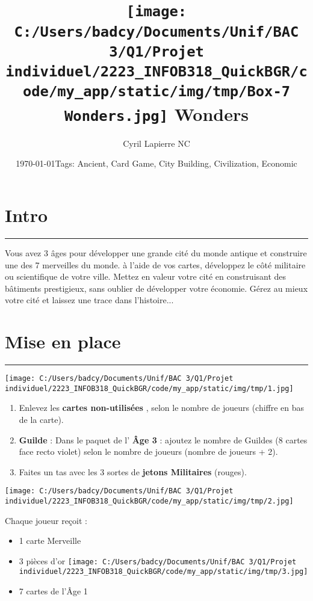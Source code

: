 \documentclass{scrartcl}%
\title{\texttt{[image: C:/Users/badcy/Documents/Unif/BAC 3/Q1/Projet individuel/2223\_INFOB318\_QuickBGR/code/my\_app/static/img/tmp/Box-7 Wonders.jpg]}\break 7 Wonders }%
\author{Cyril Lapierre NC}%
\date{\today \break Tags: Ancient, Card Game, City Building, Civilization, Economic}%
\begin{document}
%
\normalsize%
\maketitle\thispagestyle{header}%
\pagestyle{header}%
\section{ Intro
}%
\label{sec:Intro}%
\rule{18cm}{0.07cm}\break%
Vous avez 3 âges pour développer une grande cité du monde antique et construire une des 7 merveilles du
%
monde. à l’aide de vos cartes, développez le côté militaire ou scientifique de votre ville. Mettez en valeur
%
votre cité en construisant des bâtiments prestigieux, sans oublier de développer votre économie.
%
Gérez au mieux votre cité et laissez une trace dans l'histoire...


%
\section{ Mise en place
}%
\label{sec:Miseenplace}%
\rule{18cm}{0.07cm}\break%
%
\begin{center}\texttt{[image: C:/Users/badcy/Documents/Unif/BAC 3/Q1/Projet individuel/2223\_INFOB318\_QuickBGR/code/my\_app/static/img/tmp/1.jpg]}\end{center}%

%
\begin{enumerate}%
\item%
%
 Enlevez les %
\textbf{cartes non{-}utilisées}%
, selon le nombre de joueurs (chiffre en bas de la carte).
%
\item%
%
\textbf{Guilde}%
\textit{ }%
 : Dans le paquet de l'%
\textbf{Âge 3}%
\textit{ }%
 : ajoutez le nombre de Guildes (8 cartes face recto violet) selon le nombre de joueurs (nombre de joueurs + 2).
%
\item%
%
 Faites un tas avec les 3 sortes de %
\textbf{jetons Militaires}%
\textit{ }%
 (rouges).
%
\end{enumerate}%
%
\begin{center}\texttt{[image: C:/Users/badcy/Documents/Unif/BAC 3/Q1/Projet individuel/2223\_INFOB318\_QuickBGR/code/my\_app/static/img/tmp/2.jpg]}\end{center}%

%
Chaque joueur reçoit :
%
\begin{itemize}%
\item%
%
 1 carte Merveille
%
\item%
%
 3 pièces d’or %
\texttt{[image: C:/Users/badcy/Documents/Unif/BAC 3/Q1/Projet individuel/2223\_INFOB318\_QuickBGR/code/my\_app/static/img/tmp/3.jpg]}%

%
\item%
%
 7 cartes de l'Âge 1 
%
\end{itemize}
\end{document}

